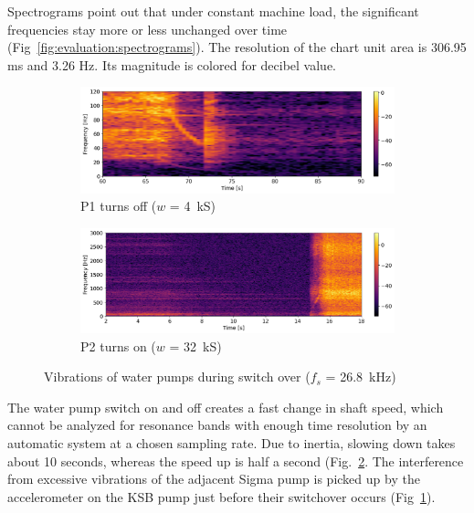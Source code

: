 Spectrograms point out that under constant machine load, the significant frequencies stay more or less unchanged over time (Fig~\ref{fig:evaluation:spectrograms}). The resolution of the chart unit area is 306.95 ms and 3.26 Hz. Its magnitude is colored for decibel value. 

\begin{figure}[h]
    \centering
    \begin{subfigure}[b]{0.48\textwidth}
        \includegraphics[width=\textwidth]{assets/results/time-frequency-spectrum/P1-slow-down.png}
        \caption{P1 turns off ($w$ = 4~kS)}
    \end{subfigure}
    \hfill
    \begin{subfigure}[b]{0.48\textwidth}
        \includegraphics[width=\textwidth]{assets/results/time-frequency-spectrum/P2-speed-up.png}
        \caption{P2 turns on ($w$ = 32~kS)}
        \label{fig:evaluation-sigma-pump-interference}
    \end{subfigure}
    \caption{Vibrations of water pumps during switch over ($f_s$ = 26.8~kHz)}
    \label{fig:evaluation:pump-switch-over}
\end{figure}


The water pump switch on and off creates a fast change in shaft speed, which cannot be analyzed for resonance bands with enough time resolution by an automatic system at a chosen sampling rate. Due to inertia, slowing down takes about 10 seconds, whereas the speed up is half a second (Fig.~\ref{fig:evaluation:pump-switch-over}. The interference from excessive vibrations of the adjacent Sigma pump is picked up by the accelerometer on the KSB pump just before their switchover occurs (Fig~\ref{fig:evaluation-sigma-pump-interference}).

